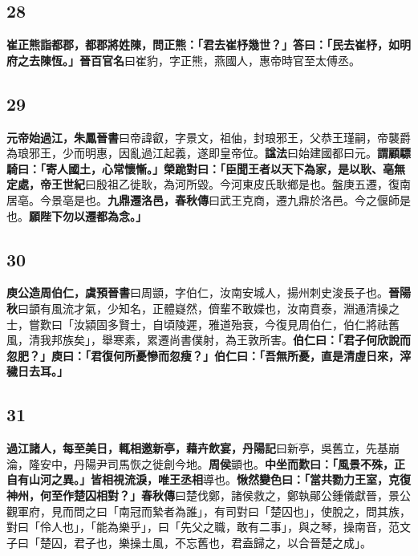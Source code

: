 \subsection*{28}

\textbf{崔正熊詣都郡，都郡將姓陳，問正熊：「君去崔杼幾世？」答曰：「民去崔杼，如明府之去陳恆。」}{\footnotesize \textbf{晉百官名}曰崔豹，字正熊，燕國人，惠帝時官至太傅丞。}

\subsection*{29}

\textbf{元帝始過江，}{\footnotesize \textbf{朱鳳晉書}曰帝諱叡，字景文，祖伷，封琅邪王，父恭王瑾嗣，帝襲爵為琅邪王，少而明惠，因亂過江起義，遂即皇帝位。\textbf{諡法}曰始建國都曰元。}\textbf{謂顧驃騎曰：「寄人國土，心常懷慚。」榮跪對曰：「臣聞王者以天下為家，是以耿、亳無定處，}{\footnotesize \textbf{帝王世紀}曰殷祖乙徙耿，為河所毀。今河東皮氏耿鄉是也。盤庚五遷，復南居亳。今景亳是也。}\textbf{九鼎遷洛邑，}{\footnotesize \textbf{春秋傳}曰武王克商，遷九鼎於洛邑。今之偃師是也。}\textbf{願陛下勿以遷都為念。」}

\subsection*{30}

\textbf{庾公造周伯仁，}{\footnotesize \textbf{虞預晉書}曰周顗，字伯仁，汝南安城人，揚州刺史浚長子也。\textbf{晉陽秋}曰顗有風流才氣，少知名，正體嶷然，儕輩不敢媟也，汝南賁泰，淵通清操之士，嘗歎曰「汝潁固多賢士，自頃陵遲，雅道殆衰，今復見周伯仁，伯仁將祛舊風，清我邦族矣」，舉寒素，累遷尚書僕射，為王敦所害。}\textbf{伯仁曰：「君子何欣說而忽肥？」庾曰：「君復何所憂慘而忽瘦？」伯仁曰：「吾無所憂，直是清虛日來，滓穢日去耳。」}

\subsection*{31}

\textbf{過江諸人，每至美日，輒相邀新亭，藉卉飲宴，}{\footnotesize \textbf{丹陽記}曰新亭，吳舊立，先基崩淪，隆安中，丹陽尹司馬恢之徙創今地。}\textbf{周侯}{\footnotesize 顗也。}\textbf{中坐而歎曰：「風景不殊，正自有山河之異。」皆相視流淚，唯王丞相}{\footnotesize 導也。}\textbf{愀然變色曰：「當共勠力王室，克復神州，何至作楚囚相對？」}{\footnotesize \textbf{春秋傳}曰楚伐鄭，諸侯救之，鄭執鄖公鍾儀獻晉，景公觀軍府，見而問之曰「南冠而縶者為誰」，有司對曰「楚囚也」，使脫之，問其族，對曰「伶人也」，「能為樂乎」，曰「先父之職，敢有二事」，與之琴，操南音，范文子曰「楚囚，君子也，樂操土風，不忘舊也，君盍歸之，以合晉楚之成」。}

